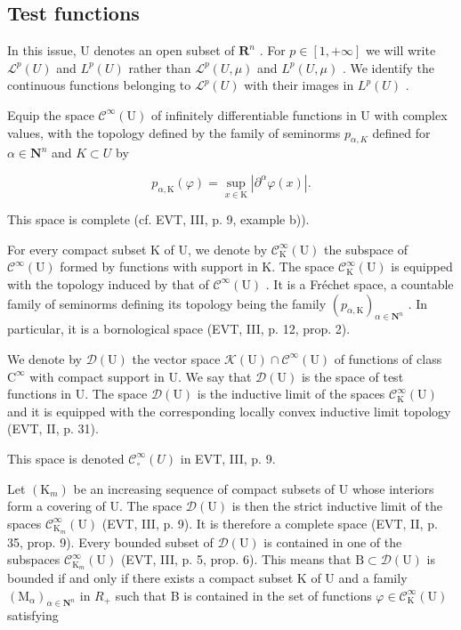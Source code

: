 \subsection{Test functions}

In this issue, U denotes an open subset of \(\mathbf{R}^{n}\) . For \(p \in [1, +\infty]\) we will write \(\mathcal{L}^{p}(U)\) and \(L^{p}(U)\) rather than \(\mathcal{L}^{p}(U, \mu)\) and \(L^{p}(U, \mu)\) . We identify the continuous functions belonging to \(\mathcal{L}^{p}(U)\) with their images in \(L^{p}(U)\) .

Equip the space \(\mathcal{C}^{\infty}(\mathrm{U})\) of infinitely differentiable functions in U with complex values, with the topology defined by the family of seminorms \(p_{\alpha,K}\) defined for \(\alpha \in \mathbf{N}^{n}\) and \(K \subset U\) by

\[
p _ {\alpha , \mathrm{K}} (\varphi) = \sup _ {x \in \mathrm{K}} | \partial^ {\alpha} \varphi (x) |.
\]

This space is complete (cf. EVT, III, p. 9, example b)).

For every compact subset K of U, we denote by \(\mathcal{C}_{\mathrm{K}}^{\infty}(\mathrm{U})\) the subspace of \(\mathcal{C}^{\infty}(\mathrm{U})\) formed by functions with support in K. The space \(\mathcal{C}_{\mathrm{K}}^{\infty}(\mathrm{U})\) is equipped with the topology induced by that of \(\mathcal{C}^{\infty}(\mathrm{U})\) . It is a Fréchet space, a countable family of seminorms defining its topology being the family \((p_{\alpha,\mathrm{K}})_{\alpha\in\mathbf{N}^{n}}\) . In particular, it is a bornological space (EVT, III, p. 12, prop. 2).

We denote by \(\mathcal{D}(\mathrm{U})\) the vector space \(\mathcal{K}(\mathrm{U})\cap \mathcal{C}^{\infty}(\mathrm{U})\) of functions of class \(\mathrm{C}^{\infty}\) with compact support in U. We say that \(\mathcal{D}(\mathrm{U})\) is the space of test functions in U. The space \(\mathcal{D}(\mathrm{U})\) is the inductive limit of the spaces \(\mathcal{C}_{\mathrm{K}}^{\infty}(\mathrm{U})\) and it is equipped with the corresponding locally convex inductive limit topology (EVT, II, p. 31).

This space is denoted \(\mathcal{C}_{\circ}^{\infty}(U)\) in EVT, III, p. 9.

Let \((\mathrm{K}_{m})\) be an increasing sequence of compact subsets of U whose interiors form a covering of U. The space \(\mathcal{D}(\mathrm{U})\) is then the strict inductive limit of the spaces \(\mathcal{C}_{\mathrm{K}_{m}}^{\infty}(\mathrm{U})\) (EVT, III, p. 9). It is therefore a complete space (EVT, II, p. 35, prop. 9). Every bounded subset of \(\mathcal{D}(\mathrm{U})\) is contained in one of the subspaces \(\mathcal{C}_{\mathrm{K}_{m}}^{\infty}(\mathrm{U})\) (EVT, III, p. 5, prop. 6). This means that \(\mathrm{B}\subset\mathcal{D}(\mathrm{U})\) is bounded if and only if there exists a compact subset K of U and a family \((\mathrm{M}_{\alpha})_{\alpha\in\mathbf{N}^{n}}\) in \(R_{+}\) such that B is contained in the set of functions \(\varphi\in\mathcal{C}_{\mathrm{K}}^{\infty}(\mathrm{U})\) satisfying

